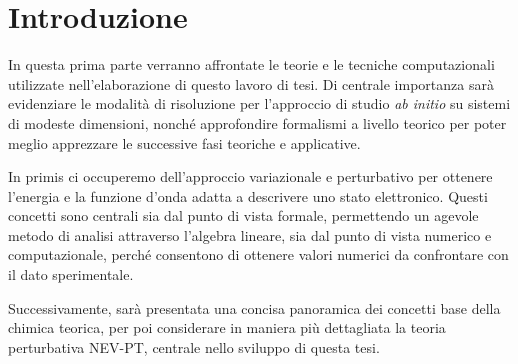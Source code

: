 \chapter{Introduzione}

In questa prima parte verranno affrontate le teorie e le tecniche computazionali
utilizzate nell'elaborazione di questo lavoro di tesi. Di centrale importanza sar\`a
evidenziare le modalit\`a di risoluzione per l'approccio di studio \textit{ab initio}
su sistemi di modeste dimensioni, nonch\'e approfondire formalismi a livello
teorico per poter meglio apprezzare le successive fasi teoriche e applicative.

In primis ci occuperemo dell'approccio variazionale e perturbativo per ottenere
l'energia e la funzione d'onda adatta a descrivere uno stato elettronico.
Questi concetti
sono centrali sia dal punto di vista formale, permettendo un agevole metodo di
analisi attraverso l'algebra lineare, sia dal punto di vista numerico e
computazionale, perch\'e consentono di ottenere valori numerici da confrontare
con il dato sperimentale.

Successivamente, sar\`a presentata una concisa panoramica dei concetti base
della chimica teorica, per poi considerare in maniera pi\`u dettagliata la teoria
perturbativa NEV-PT, centrale nello sviluppo di questa tesi.






